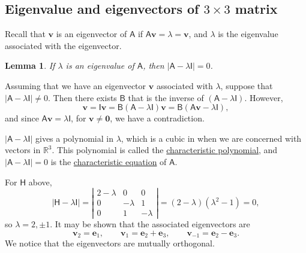 \documentclass[10pt,notitlepage]{revtex4-1}
\newtheorem{lemma}[theorem]{Lemma}
\newenvironment{proof}[1][Proof]{\begin{trivlist}
\item[\hskip \labelsep {\bfseries #1}]}{\end{trivlist}}
\newenvironment{example}[1][Example]{\begin{trivlist}
\item[\hskip \labelsep {\bfseries #1}]}{\end{trivlist}}
\newcommand{\eb}{\boldsymbol{e}}
\newcommand{\vb}{\boldsymbol{v}}
\begin{document}
\subsection{Eigenvalue and eigenvectors of $3\times3$ matrix}

Recall that $\vb$ is an eigenvector of $\mathsf{A}$ if
$\mathsf{A}\vb=\lambda=\vb$, and $\lambda$ is the eigenvalue associated with the
eigenvector.
\begin{lemma}
	If $\lambda$ is an eigenvalue of $\mathsf{A}$, then
	$|\mathsf{A}-\lambda\mathsf{I}|=0$.
\end{lemma}
\begin{proof}
	Assuming that we have an eigenvector $\vb$ associated with $\lambda$,
	suppose that $|\mathsf{A}-\lambda\mathsf{I}|\neq0$. Then there exists
	$\mathsf{B}$ that is the inverse of $(\mathsf{A}-\lambda\mathsf{I})$.
	However,
	\begin{equation}
		\vb=\mathsf{I}\vb=\mathsf{B}(\mathsf{A}-\lambda\mathsf{I})\vb=
		\mathsf{B}(\mathsf{A}\vb-\lambda\mathsf{I}),
	\end{equation}
	and since $\mathsf{A}\vb=\lambda\mathsf{I}$, for $\vb\neq\boldsymbol{0}$, we
	have a contradiction.
\end{proof}
$|\mathsf{A}-\lambda\mathsf{I}|$ gives a polynomial in $\lambda$, which is a
cubic in when we are concerned with vectors in $\mathbb{R}^3$. This polynomial
is called the \underline{characteristic polynomial}, and
$|\mathsf{A}-\lambda\mathsf{I}|=0$ is the \underline{characteristic equation} of
$\mathsf{A}$.
\begin{example}
	For $\mathsf{H}$ above,
	\begin{equation}
		|\mathsf{H}-\lambda\mathsf{I}|=\left|\begin{matrix}
		2-\lambda & 0 & 0\\ 0 & -\lambda & 1 \\ 0 & 1 & -\lambda\end{matrix}
		\right|= (2-\lambda)(\lambda^2-1)=0,
	\end{equation}
	so $\lambda=2,\pm1$. It may be shown that the associated eigenvectors are
	\begin{equation}
		\vb_2 = \eb_1,\qquad \vb_1 = \eb_2 + \eb_3,\qquad
		\vb_{-1} = \eb_2-\eb_3.
	\end{equation}
	We notice that the eigenvectors are mutually orthogonal.
\end{example}
\end{document}
